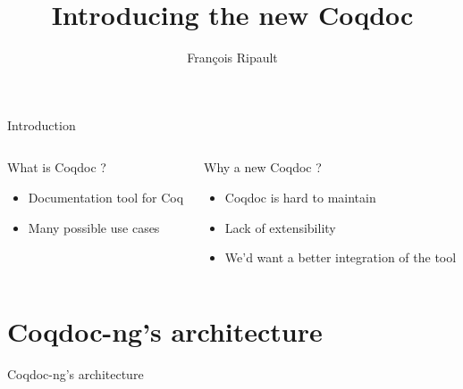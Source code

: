 \documentclass[compress]{beamer}
\title{Introducing the new Coqdoc}
\author{François Ripault}
\begin{document}
\begin{frame}
\titlepage
\end{frame}

\begin{frame}{Introduction}
  \begin{columns}[2]
    \begin{column}{0.5\textwidth}
      What is Coqdoc ?
      \begin{itemize}
        \item Documentation tool for Coq
        \item Many possible use cases
      \end{itemize}
    \end{column}
    \begin{column}{0.5\textwidth}
      Why a new Coqdoc ?
      \begin{itemize}
        \item Coqdoc is hard to maintain
        \item Lack of extensibility
        \item We'd want a better integration of the tool
      \end{itemize}
    \end{column}
  \end{columns}
\end{frame}

\begin{frame}
    \tableofcontents
\end{frame}

\section{Coqdoc-ng's architecture}
  \begin{frame}{Coqdoc-ng's architecture}
    
  \end{frame}
\end{document}
